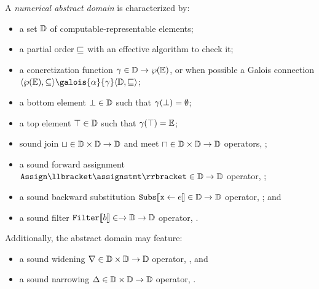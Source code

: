 \begin{definition}
  A \emph{numerical abstract domain} is characterized by:
  \begin{itemize}
    \item a set $\mathbb{D}$ of computable-representable elements;
    \item a partial order $\sqsubseteq$ with an effective algorithm to check it;
    \item a concretization function $\gamma\in\mathbb{D}\to\wp(\mathbb{E})$, or when possible a Galois connection
    $\tuple{\setof\env}{\subseteq}\galois{\abstractdomainabstraction}{\abstractdomainconcretization}\tuple{\abstractdomain}{\abstractdomainsubseteq}$;
    \item a bottom element $\bot\in\mathbb{D}$ such that $\gamma(\bot) = \emptyset$;
    \item a top element $\top\in\mathbb{D}$ such that $\gamma(\top) = \mathbb{E}$;
    \item sound join $\sqcup\in\mathbb{D}\times\mathbb{D}\to\mathbb{D}$ and meet $\sqcap\in\mathbb{D}\times\mathbb{D}\to\mathbb{D}$ operators, \cf{} ;
    \item a sound forward assignment $\abstractdomainassign\semanticsof{\assignstmt}\in\abstractdomain\to\abstractdomain$ operator, \cf{} ;
    \item a sound backward substitution $\textup{\texttt{Subs}}\llbracket \textup{\texttt{x}}\leftarrow e \rrbracket\in\mathbb{D}\to\mathbb{D}$ operator, \cf{} ; and
    \item a sound filter $\textup{\texttt{Filter}}\llbracket b \rrbracket\in\to\mathbb{D}\to\mathbb{D}$ operator, \cf{} .
  \end{itemize}
  Additionally, the abstract domain may feature:
  \begin{itemize}
    \item a sound widening $\nabla\in\mathbb{D}\times\mathbb{D}\to\mathbb{D}$ operator, \cf{} , and
    \item a sound narrowing $\Delta\in\mathbb{D}\times\mathbb{D}\to\mathbb{D}$ operator, \cf{} .
  \end{itemize}
\end{definition}



